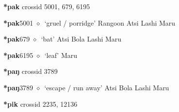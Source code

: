 \item
\textbf{*pak}
  {\tiny crossid 5001, 679, 6195}
  \begin{list}{}{\leftmargin=1.5em \itemindent=-1.5em}
  \item {\footnotesize \textbf{*pak}}{\tiny 5001}
         $\diamond$~`gruel / porridge'
         Rangoon 
\hspace{1ex}
         Atsi 
\hspace{1ex}
         Lashi 
\hspace{1ex}
         Maru 
  \item {\footnotesize \textbf{*pak}}{\tiny 679}
\hspace{1ex}
         $\diamond$~`bat'
         Atsi 
\hspace{1ex}
         Bola 
\hspace{1ex}
         Lashi 
\hspace{1ex}
         Maru 
  \item {\footnotesize \textbf{*pak}}{\tiny 6195}
\hspace{1ex}
         $\diamond$~`leaf'
         Maru 
  \end{list}
\item
\textbf{*paŋ}
  {\tiny crossid 3789}
  \begin{list}{}{\leftmargin=1.5em \itemindent=-1.5em}
  \item {\footnotesize \textbf{*paŋ}}{\tiny 3789}
         $\diamond$~`escape / run away'
         Atsi 
\hspace{1ex}
         Bola 
\hspace{1ex}
         Lashi 
\hspace{1ex}
         Maru 
  \end{list}
\item
\textbf{*pik}
  {\tiny crossid 2235, 12136}
